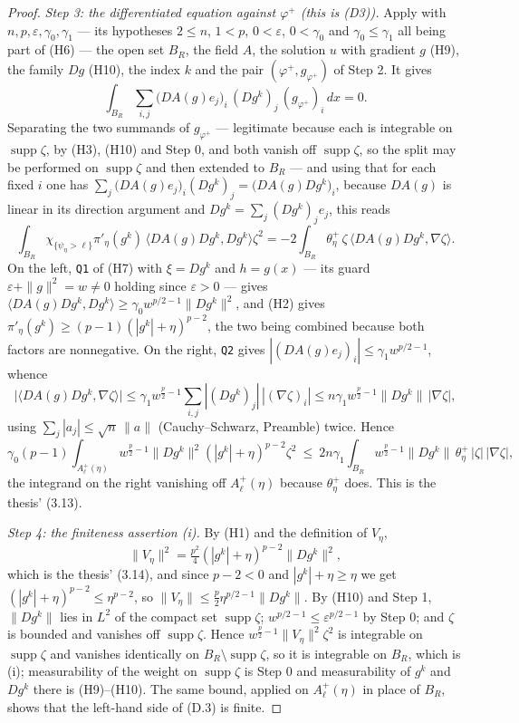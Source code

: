 \begin{proof}
\emph{Step 3: the differentiated equation against $\varphi^+$ (this is (D3)).}
Apply  with
$n,p,\varepsilon,\gamma_0,\gamma_1$ --- its hypotheses $2\le n$, $1<p$,
$0<\varepsilon$, $0<\gamma_0$ and $\gamma_0\le\gamma_1$ all being part of (H6)
--- the open set $B_R$, the field $A$, the solution $u$ with gradient $g$
(H9), the family $Dg$ (H10), the index $k$ and the pair
$(\varphi^+,g_{\varphi^+})$ of Step 2.  It gives
\[
\int_{B_R}\sum_{i,j}\bigl(DA(g)e_j\bigr)_i\,(Dg^k)_j\,(g_{\varphi^+})_i\,dx=0 .
\]
Separating the two summands of $g_{\varphi^+}$ --- legitimate because each is
integrable on $\operatorname{supp}\zeta$, by (H3), (H10) and Step 0, and both
vanish off $\operatorname{supp}\zeta$, so the split may be performed on
$\operatorname{supp}\zeta$ and then extended to $B_R$ --- and using that for
each fixed $i$ one has
$\sum_j\bigl(DA(g)e_j\bigr)_i(Dg^k)_j=\bigl(DA(g)Dg^k\bigr)_i$, because
$DA(g)$ is linear in its direction argument and $Dg^k=\sum_j(Dg^k)_je_j$, this
reads
\[
\int_{B_R}\chi_{\{\psi_\eta>\ell\}}\pi'_\eta(g^k)\,
\bigl\langle DA(g)Dg^k,Dg^k\bigr\rangle\zeta^2
=-2\int_{B_R}\theta^+_\eta\,\zeta\,
\bigl\langle DA(g)Dg^k,\nabla\zeta\bigr\rangle .
\]
On the left, \texttt{Q1} of (H7) with $\xi=Dg^k$ and $h=g(x)$ --- its guard
$\varepsilon+\|g\|^2=w\ne0$ holding since $\varepsilon>0$ --- gives
$\langle DA(g)Dg^k,Dg^k\rangle\ge\gamma_0w^{p/2-1}\|Dg^k\|^2$, and (H2) gives
$\pi'_\eta(g^k)\ge(p-1)(|g^k|+\eta)^{p-2}$, the two being combined because
both factors are nonnegative.  On the right, \texttt{Q2} gives
$|(DA(g)e_j)_i|\le\gamma_1w^{p/2-1}$, whence
\[
\bigl|\langle DA(g)Dg^k,\nabla\zeta\rangle\bigr|
\le\gamma_1w^{\frac p2-1}\sum_{i,j}|(Dg^k)_j|\,|(\nabla\zeta)_i|
\le n\gamma_1w^{\frac p2-1}\|Dg^k\|\,|\nabla\zeta| ,
\]
using $\sum_j|a_j|\le\sqrt n\,\|a\|$ (Cauchy--Schwarz, Preamble) twice.  Hence
\[
\gamma_0(p-1)\!\!\int_{A^+_\ell(\eta)}\!\!
w^{\frac p2-1}\|Dg^k\|^2(|g^k|+\eta)^{p-2}\zeta^2
\ \le\ 2n\gamma_1\!\!\int_{B_R}\!\!
w^{\frac p2-1}\|Dg^k\|\,\theta^+_\eta\,|\zeta|\,|\nabla\zeta| ,
\tag{D.3}
\]
the integrand on the right vanishing off $A^+_\ell(\eta)$ because
$\theta^+_\eta$ does.  This is the thesis' (3.13).

\emph{Step 4: the finiteness assertion (i).}  By (H1) and the definition of
$V_\eta$,
\[
\|V_\eta\|^2=\tfrac{p^2}4(|g^k|+\eta)^{p-2}\|Dg^k\|^2 ,
\]
which is the thesis' (3.14), and since $p-2<0$ and $|g^k|+\eta\ge\eta$ we get
$(|g^k|+\eta)^{p-2}\le\eta^{p-2}$, so
$\|V_\eta\|\le\tfrac p2\eta^{p/2-1}\|Dg^k\|$.  By (H10) and Step 1,
$\|Dg^k\|$ lies in $L^2$ of the compact set $\operatorname{supp}\zeta$;
$w^{p/2-1}\le\varepsilon^{p/2-1}$ by Step 0; and $\zeta$ is bounded and
vanishes off $\operatorname{supp}\zeta$.  Hence
$w^{\frac p2-1}\|V_\eta\|^2\zeta^2$ is integrable on $\operatorname{supp}\zeta$
and vanishes identically on $B_R\setminus\operatorname{supp}\zeta$, so it is
integrable on $B_R$, which is (i); measurability of the weight on
$\operatorname{supp}\zeta$ is Step 0 and measurability of $g^k$ and $Dg^k$
there is (H9)--(H10).  The same bound, applied on $A^+_\ell(\eta)$ in place of
$B_R$, shows that the left-hand side of (D.3) is finite.


\end{proof}
